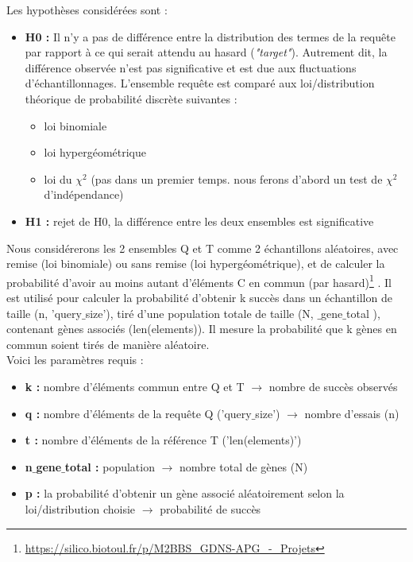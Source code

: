 \documentclass[a4paper,11pt,openright]{report}
\begin{document}
Les hypothèses considérées sont : 
\begin{itemize}
\item \textbf{H0 : } Il n'y a pas de différence  entre la distribution des termes de la requête par rapport à ce qui serait attendu au hasard (\textit{"target"}). Autrement dit, la différence observée n’est pas significative et est due aux fluctuations d’échantillonnages. L'ensemble requête est comparé aux loi/distribution théorique de probabilité discrète suivantes :
	\begin{itemize}[label=\textbullet]
	\item loi binomiale
	\item loi hypergéométrique
	\item loi du $\chi^2$ (pas dans un premier temps. nous ferons d'abord un test de $\chi^2$ d'indépendance)
	\end{itemize}
\item \textbf{H1 : } rejet de H0, la différence entre les deux ensembles est significative
\end{itemize}

Nous considérerons les 2 ensembles Q et T comme 2 échantillons aléatoires, avec remise (loi binomiale) ou sans remise (loi hypergéométrique), et de calculer la probabilité d'avoir au moins autant d'éléments C en commun (par hasard)\footnote{\url{https://silico.biotoul.fr/p/M2BBS_GDNS-APG_-_Projets}} . Il est utilisé pour calculer la probabilité d'obtenir k succès dans un échantillon de taille (n, 'query$\_$size'), tiré d'une population totale de taille (N, $\_$gene$\_$total ), contenant  gènes associés (len(elements)). Il mesure la probabilité que k gènes en commun soient tirés de manière aléatoire.\\

Voici les paramètres requis :
\begin{itemize}
\item \textbf{k : } nombre d'éléments commun entre Q et T $\rightarrow$ nombre de succès observés
\item \textbf{q : } nombre d'éléments de la requête Q ('query$\_$size') $\rightarrow$ nombre d'essais (n)
\item \textbf{t : } nombre d'éléments de la référence T ('len(elements)')       
\item \textbf{n$\_$gene$\_$total : } population $\rightarrow$ nombre total de gènes (N)
\item \textbf{p : } la probabilité d'obtenir un gène associé aléatoirement selon la loi/distribution choisie $\rightarrow$  probabilité de succès
\end{itemize} 
\end{document}
